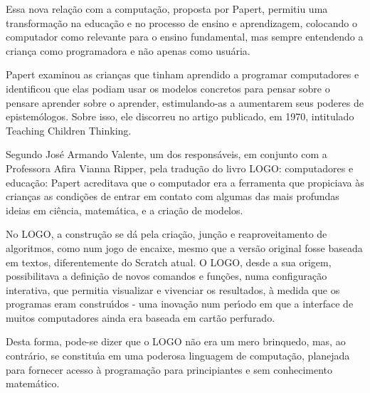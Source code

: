 \documentclass[
12pt,		%
openright,	%
twoside,  %
a4paper,			%
chapter=TITLE,		%
english,			%
french,				%
spanish,			%
brazil				%
]{USPSC-classe/USPSC}
\begin{document}
\noindent\begin{center}\mbox{\centering{}}\end{center}


Essa nova rela\c{c}\~ao com a computa\c{c}\~ao, proposta por Papert, permitiu uma transforma\c{c}\~ao na educa\c{c}\~ao e no processo de ensino e aprendizagem, colocando o computador como relevante para o ensino fundamental, mas sempre entendendo a crian\c{c}a como programadora e n\~ao apenas como usu\'aria.


Papert examinou as crian\c{c}as que tinham aprendido a programar computadores e identificou que elas podiam usar os modelos concretos para \textquotedbl pensar sobre o pensar\textquotedbl  e \textquotedbl aprender sobre o aprender\textquotedbl  [XXX], estimulando-as  a aumentarem seus poderes de epistem\'ologos. Sobre isso, ele discorreu no artigo publicado, em 1970, intitulado Teaching Children Thinking.


Segundo Jos\'e Armando Valente, um dos respons\'aveis, em conjunto com a Professora Afira Vianna Ripper, pela tradu\c{c}\~ao do livro LOGO: computadores e educa\c{c}\~ao: \textquotedbl Papert acreditava que o computador era a ferramenta que propiciava \`as crian\c{c}as as condi\c{c}\~oes de entrar em contato com algumas das mais profundas ideias em ci\^encia, matem\'atica, e a cria\c{c}\~ao de modelos\textquotedbl .


No LOGO, a constru\c{c}\~ao se d\'a pela cria\c{c}\~ao, jun\c{c}\~ao e reaproveitamento de algoritmos, como num jogo de encaixe, mesmo que a vers\~ao original fosse baseada em textos, diferentemente do Scratch atual. O LOGO, desde a sua origem, possibilitava a defini\c{c}\~ao de novos comandos e fun\c{c}\~oes, numa configura\c{c}\~ao interativa, que permitia visualizar e vivenciar os resultados, \`a medida que os programas eram constru\'{\i}dos  - uma inova\c{c}\~ao num per\'{\i}odo em que a interface de muitos computadores ainda era baseada em cart\~ao perfurado.


Desta forma, pode-se dizer que o LOGO n\~ao era um mero brinquedo, mas, ao contr\'ario, se constitu\'{\i}a em uma poderosa linguagem de computa\c{c}\~ao, planejada para fornecer acesso \`a programa\c{c}\~ao para principiantes e sem conhecimento matem\'atico.
\end{document}
